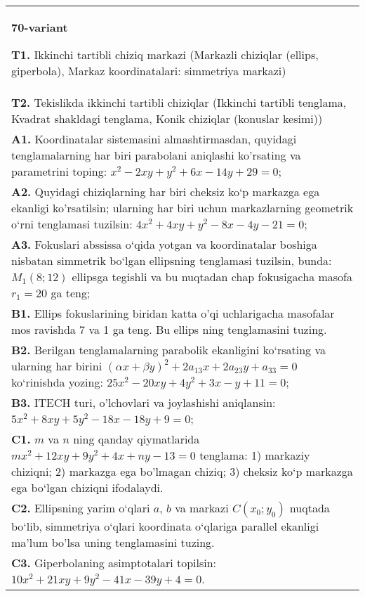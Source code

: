 \documentclass{article}
\begin{document}
\begin{tabular}{m{17cm}}
\textbf{70-variant}
\newline

\textbf{T1.} Ikkinchi tartibli chiziq markazi (Markazli chiziqlar (ellips, giperbola), Markaz koordinatalari: simmetriya markazi) \\
\textbf{T2.} Tekislikda ikkinchi tartibli chiziqlar (Ikkinchi tartibli tenglama, Kvadrat shakldagi tenglama, Konik chiziqlar (konuslar kesimi)) \\
\textbf{A1.} Koordinatalar sistemasini almashtirmasdan, quyidagi tenglamalarning har biri parabolani aniqlashi ko'rsating va parametrini toping: $x^2-2 x y+y^2+6 x-14 y+29=0$; \\
\textbf{A2.} Quyidagi chiziqlarning har biri cheksiz ko‘p markazga ega ekanligi ko'rsatilsin; ularning har biri uchun markazlarning geometrik o‘rni tenglamasi tuzilsin: $4 x^2+4 x y+y^2-8 x-4 y-21=0$; \\
\textbf{A3.} Fokuslari abssissa o‘qida yotgan va koordinatalar boshiga nisbatan simmetrik bo‘lgan ellipsning tenglamasi tuzilsin, bunda: $M_1(8 ; 12)$ ellipsga tegishli va bu nuqtadan chap fokusigacha masofa $r_1=20$ ga teng; \\
\textbf{B1.} Ellips fokuslarining biridan katta o'qi uchlarigacha masofalar mos ravishda 7 va 1 ga teng. Bu ellips ning tenglamasini tuzing. \\
\textbf{B2.} Berilgan tenglamalarning parabolik ekanligini ko‘rsating va ularning har birini $(\alpha x+\beta y)^2+2 a_{13} x+2 a_{23} y+a_{33}=0$ ko‘rinishda yozing: $25 x^2-20 x y+4 y^2+3 x-y+11=0$; \\
\textbf{B3.} ITECH turi, o'lchovlari va joylashishi aniqlansin: $5 x^2+8 x y+5 y^2-18 x-18 y+9=0$; \\
\textbf{C1.} $m$ va $n$ ning qanday qiymatlarida $m x^2+12 x y+9 y^2+4 x+n y-13=0$ tenglama: 1) markaziy chiziqni; 2) markazga ega bo'lmagan chiziq; 3) cheksiz ko‘p markazga ega bo‘lgan chiziqni ifodalaydi. \\
\textbf{C2.} Ellipsning yarim o‘qlari $a$, $b$ va markazi $C\left(x_0; y_0\right)$ nuqtada bo‘lib, simmetriya o‘qlari koordinata o‘qlariga parallel ekanligi ma’lum bo'lsa uning tenglamasini tuzing. \\
\textbf{C3.} Giperbolaning asimptotalari topilsin: $10 x^2+21 x y+9 y^2-41 x-39 y+4=0$. \\

\end{tabular}
\vspace{1cm}
\end{document}

